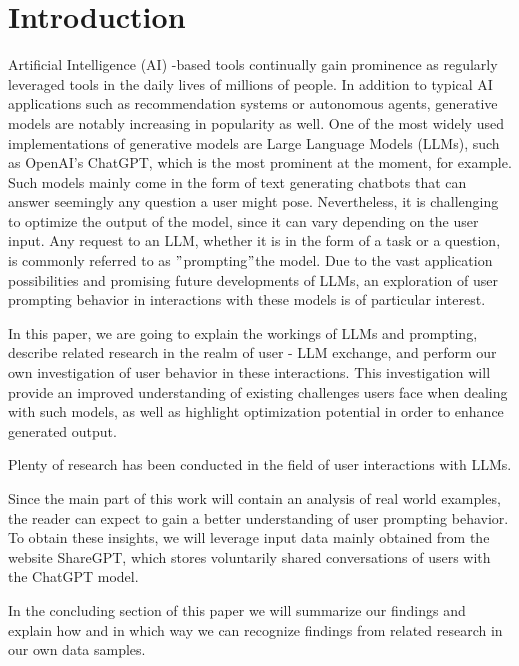 
\section{Introduction}
\label{sec:introduction}

\sloppy %
Artificial Intelligence (AI) -based tools continually gain prominence as regularly leveraged tools in the
daily lives of millions of people.
In addition to typical AI applications such as recommendation systems or autonomous agents, generative
models are notably increasing in popularity as well.
One of the most widely used implementations of generative models are Large Language Models (LLMs),
such as OpenAI's ChatGPT, which is the most prominent at the moment, for example. %
Such models mainly come in the form of text generating chatbots that can answer seemingly any question
a user might pose.
Nevertheless, it is challenging to optimize the output of the model, since it can vary depending
on the user input. %
Any request to an LLM, whether it is in the form of a task or a question, is commonly referred to as
\("\)prompting\("\)the model.
Due to the vast application possibilities and promising future developments of LLMs,
an exploration of user prompting behavior in interactions with these models is of particular interest.

In this paper, we are going to explain the workings of LLMs and prompting, describe related research
in the realm of user - LLM exchange, and perform our own investigation of user behavior in these
interactions.
This investigation will provide an improved understanding of existing challenges users face when
dealing with such models, as well as highlight optimization potential in order to enhance generated
output.

Plenty of research has been conducted in the field of user interactions with LLMs.

Since the main part of this work will contain an analysis of real world examples, the reader can
expect to gain a better understanding of user prompting behavior.
To obtain these insights, we will leverage input data mainly obtained from the website
ShareGPT, %
which stores voluntarily shared conversations of users with the ChatGPT model. %

In the concluding section of this paper we will summarize our findings and explain how and in which way
we can recognize findings from related research in our own data samples.